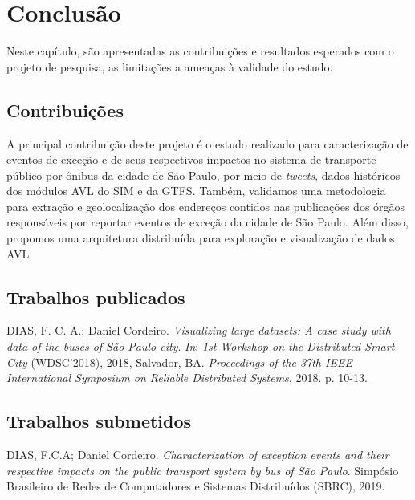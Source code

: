 \documentclass[
	12pt,				%
	oneside,			%
	a4paper,			%
	english,			%
	brazil				%
	]{abntex2ppgsi}
\begin{document}
{{{\chapter{Conclusão}
\label{conclusion}

Neste capítulo, são apresentadas as contribuições e resultados esperados com o projeto de pesquisa, as limitações a ameaças à validade do estudo. 

\section{Contribuições}

A principal contribuição deste projeto é o estudo realizado para caracterização de eventos de exceção e de seus respectivos impactos no sistema de transporte público por ônibus da cidade de São Paulo, por meio de \textit{tweets}, dados históricos dos módulos AVL do SIM e da GTFS. %
Também, validamos uma metodologia para extração e geolocalização dos endereços contidos nas publicações dos órgãos responsáveis por reportar eventos de exceção da cidade de São Paulo. Além disso, propomos uma arquitetura distribuída para exploração e visualização de dados AVL.

\section{Trabalhos publicados}

DIAS, F. C. A.; Daniel Cordeiro. \textit{Visualizing large datasets: A case study with data of the buses of São Paulo city}. \textit{In}: \textit{1st Workshop on the Distributed Smart City} (WDSC'2018), 2018, Salvador, BA. \textit{Proceedings of the 37th IEEE International Symposium on Reliable Distributed Systems}, 2018. p. 10-13.

\section{Trabalhos submetidos}

DIAS, F.C.A; Daniel Cordeiro. \textit{Characterization of exception events and their respective impacts on the public transport system by bus of São Paulo}. Simpósio Brasileiro de Redes de Computadores e Sistemas Distribuídos (SBRC), 2019.

}}}
\end{document}

